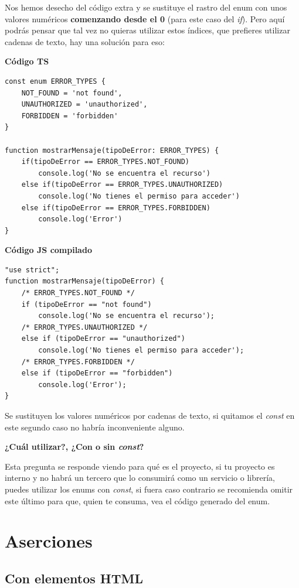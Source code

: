 Nos hemos desecho del código extra y se sustituye el rastro del enum con unos valores numéricos \textbf{comenzando desde el 0} (para este caso del \textit{if}). Pero aquí podrás pensar que tal vez no quieras utilizar estos índices, que prefieres utilizar cadenas de texto, hay una solución para eso:

\textbf{Código TS}
\begin{lstlisting}
const enum ERROR_TYPES {
    NOT_FOUND = 'not found',
    UNAUTHORIZED = 'unauthorized',
    FORBIDDEN = 'forbidden'
}

function mostrarMensaje(tipoDeError: ERROR_TYPES) {
    if(tipoDeError == ERROR_TYPES.NOT_FOUND)
        console.log('No se encuentra el recurso')
    else if(tipoDeError == ERROR_TYPES.UNAUTHORIZED)
        console.log('No tienes el permiso para acceder')
    else if(tipoDeError == ERROR_TYPES.FORBIDDEN)
        console.log('Error')
}
\end{lstlisting}

\textbf{Código JS compilado}
\begin{lstlisting}
"use strict";
function mostrarMensaje(tipoDeError) {
    /* ERROR_TYPES.NOT_FOUND */
    if (tipoDeError == "not found")
        console.log('No se encuentra el recurso');
    /* ERROR_TYPES.UNAUTHORIZED */
    else if (tipoDeError == "unauthorized")
        console.log('No tienes el permiso para acceder');
    /* ERROR_TYPES.FORBIDDEN */
    else if (tipoDeError == "forbidden")
        console.log('Error');
}
\end{lstlisting}

Se sustituyen los valores numéricos por cadenas de texto, si quitamos el \textit{const} en este segundo caso no habría inconveniente alguno.

\textbf{¿Cuál utilizar?, ¿Con o sin \textit{const}?}

Esta pregunta se responde viendo para qué es el proyecto, si tu proyecto es interno y no habrá un tercero que lo consumirá como un servicio o librería, puedes utilizar los enums con \textit{const}, si fuera caso contrario se recomienda omitir este último para que, quien te consuma, vea el código generado del enum.



\section{Aserciones}


\subsection{Con elementos HTML}

